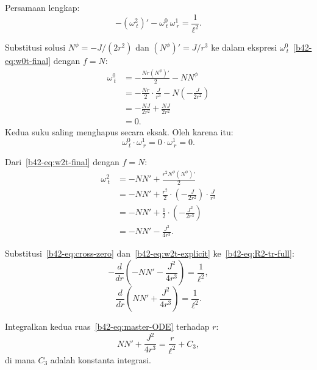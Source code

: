 Persamaan lengkap:
\begin{equation}
    -(\omega^2_{\ t})' - \omega^0_{\ t}\,\omega^1_{\ r} = \frac{1}{\ell^2}. \label{b42-eq:R2-tr-full}
\end{equation}

Substitusi solusi $N^\phi = -J/(2r^2)$ dan $(N^\phi)' = J/r^3$ ke dalam ekspresi $\omega^0_{\ t}$~\eqref{b42-eq:w0t-final} dengan $f = N$:
\begin{align}
    \omega^0_{\ t} &= -\frac{Nr(N^\phi)'}{2} - NN^\phi \nonumber\\[6pt]
    &= -\frac{Nr}{2}\cdot\frac{J}{r^3} - N\!\left(-\frac{J}{2r^2}\right) \nonumber\\[6pt]
    &= -\frac{NJ}{2r^2} + \frac{NJ}{2r^2} \nonumber\\[6pt]
    &= 0. \label{b42-eq:w0t-zero}
\end{align}
Kedua suku saling menghapus secara eksak. Oleh karena itu:
\begin{equation}
    \omega^0_{\ t}\cdot\omega^1_{\ r} = 0\cdot\omega^1_{\ r} = 0. \label{b42-eq:cross-zero}
\end{equation}

Dari~\eqref{b42-eq:w2t-final} dengan $f = N$:
\begin{align}
    \omega^2_{\ t} &= -NN' + \frac{r^2N^\phi(N^\phi)'}{2} \nonumber\\[6pt]
    &= -NN' + \frac{r^2}{2}\cdot\left(-\frac{J}{2r^2}\right)\cdot\frac{J}{r^3} \nonumber\\[6pt]
    &= -NN' + \frac{1}{2}\cdot\left(-\frac{J^2}{2r^3}\right) \nonumber\\[6pt]
    &= -NN' - \frac{J^2}{4r^3}. \label{b42-eq:w2t-explicit}
\end{align}

Substitusi~\eqref{b42-eq:cross-zero} dan~\eqref{b42-eq:w2t-explicit} ke~\eqref{b42-eq:R2-tr-full}:
\begin{equation}
    -\frac{d}{dr}\!\left(-NN' - \frac{J^2}{4r^3}\right) = \frac{1}{\ell^2},
\end{equation}
\begin{equation}
    \frac{d}{dr}\!\left(NN' + \frac{J^2}{4r^3}\right) = \frac{1}{\ell^2}. \label{b42-eq:master-ODE}
\end{equation}

Integralkan kedua ruas~\eqref{b42-eq:master-ODE} terhadap $r$:
\begin{equation}
    NN' + \frac{J^2}{4r^3} = \frac{r}{\ell^2} + C_3, \label{b42-eq:first-int}
\end{equation}
di mana $C_3$ adalah konstanta integrasi.

